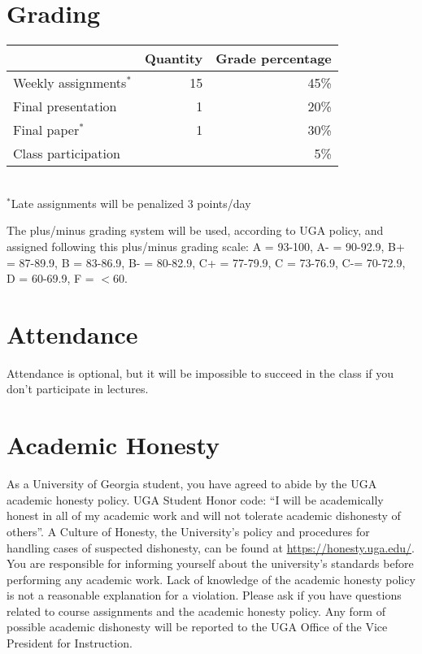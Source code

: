 \documentclass[12pt]{article}
\begin{document}
  

\vspace{-2mm}
\section*{\normalsize Grading}
\vspace{-4mm}
\begin{center}
  \begin{tabular}[h!]{lrr}
    \hline
                           & Quantity & Grade percentage         \\
    \hline
    Weekly assignments$^*$ & 15       & 45\%                     \\
    Final presentation     & 1        & 20\%                     \\
    Final paper$^{*}$      & 1        & 30\%                     \\
    Class participation    &          & 5\%                      \\
    \hline
  \end{tabular}                                                  \\
  \small
\hspace{0mm} $^*$Late assignments will be penalized 3 points/day \\ 
\end{center}
The plus/minus grading system will be used, according to UGA policy,
and assigned following this plus/minus grading scale: A = 93-100, A- =
90-92.9, B+ = 87-89.9, B = 83-86.9, B- = 80-82.9, C+ = 77-79.9, C =
73-76.9, C-= 70-72.9, D = 60-69.9, F = $<$60. 


\vspace{-2mm}
\section*{\normalsize Attendance}
\vspace{-4mm}
Attendance is optional, but it will be impossible to succeed in the
class if you don't participate in lectures. 



\vspace{-2mm}
\section*{\normalsize Academic Honesty}
\vspace{-4mm}
As a University of Georgia student, you have agreed to abide by the
UGA academic honesty policy. UGA Student Honor code: ``I will be
academically honest in all of my academic work and will not tolerate
academic dishonesty of others''. A Culture of Honesty, the University's
policy and procedures for handling cases of suspected dishonesty, can
be found at \url{https://honesty.uga.edu/}. You are responsible for
informing yourself about the university’s standards before performing
any academic work. Lack of knowledge of the academic honesty policy is
not a reasonable explanation for a violation. Please ask if you have
questions related to course assignments and the academic honesty
policy. Any form of possible academic dishonesty will be reported to
the UGA Office of the Vice President for Instruction.
\end{document}
